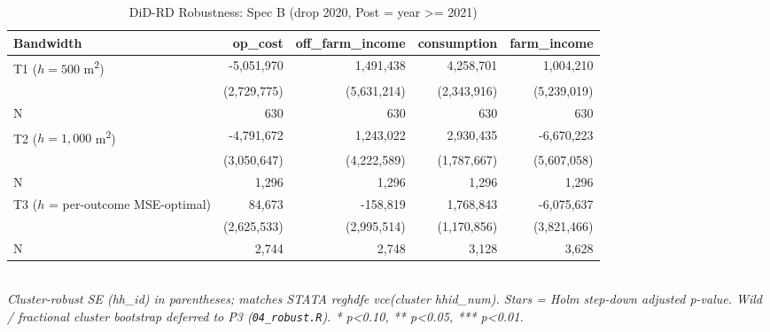 \begin{table}[t]
\centering
\caption{DiD-RD Robustness: Spec B (drop 2020, Post = year >= 2021)}
\label{tab:specB}
\scriptsize
\setlength{\tabcolsep}{4pt}
\begin{tabular}{lrrrr}
\toprule
Bandwidth & op\_cost & off\_farm\_income & consumption & farm\_income \\
\midrule
T1 ($h = 500$ m\textsuperscript{2}) & -5,051,970 & 1,491,438 & 4,258,701 & 1,004,210 \\
        & (2,729,775) & (5,631,214) & (2,343,916) & (5,239,019) \\
N       & 630 & 630 & 630 & 630 \\
T2 ($h = 1{,}000$ m\textsuperscript{2}) & -4,791,672 & 1,243,022 & 2,930,435 & -6,670,223 \\
        & (3,050,647) & (4,222,589) & (1,787,667) & (5,607,058) \\
N       & 1,296 & 1,296 & 1,296 & 1,296 \\
T3 ($h$ = per-outcome MSE-optimal) & 84,673 & -158,819 & 1,768,843 & -6,075,637 \\
        & (2,625,533) & (2,995,514) & (1,170,856) & (3,821,466) \\
N       & 2,744 & 2,748 & 3,128 & 3,628 \\
\bottomrule
\end{tabular}
\\
\footnotesize\textit{Cluster-robust SE (hh\_id) in parentheses; matches STATA reghdfe vce(cluster hhid\_num). Stars = Holm step-down adjusted p-value. Wild / fractional cluster bootstrap deferred to P3 (\texttt{04\_robust.R}). * p<0.10, ** p<0.05, *** p<0.01.}
\end{table}

